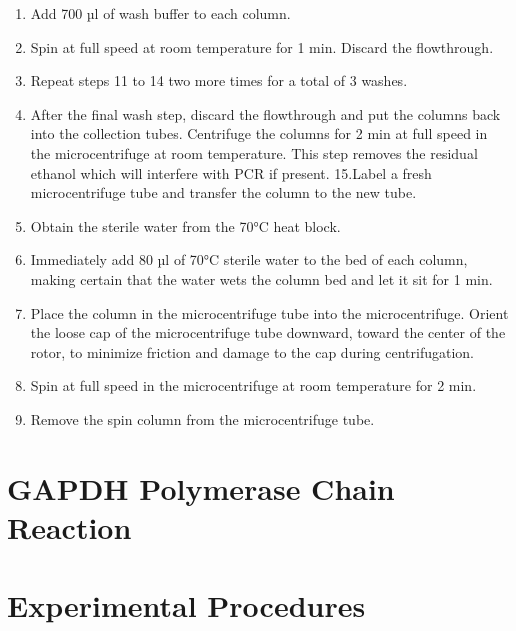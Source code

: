 \documentclass[]{book}
\providecommand{\tightlist}{%
  \setlength{\itemsep}{0pt}\setlength{\parskip}{0pt}}
\theoremstyle{definition}
\theoremstyle{definition}
\theoremstyle{definition}
\theoremstyle{remark}
\begin{document}
\begin{enumerate}
\def\labelenumi{\arabic{enumi}.}
\setcounter{enumi}{12}
\tightlist
\item
  Add 700 µl of wash buffer to each column.
\item
  Spin at full speed at room temperature for 1 min. Discard the
  flowthrough.
\item
  Repeat steps 11 to 14 two more times for a total of 3 washes.
\item
  After the final wash step, discard the flowthrough and put the columns
  back into the collection tubes. Centrifuge the columns for 2 min at
  full speed in the microcentrifuge at room temperature. This step
  removes the residual ethanol which will interfere with PCR if present.
  15.Label a fresh microcentrifuge tube and transfer the column to the
  new tube.
\item
  Obtain the sterile water from the 70°C heat block.
\item
  Immediately add 80 µl of 70°C sterile water to the bed of each column,
  making certain that the water wets the column bed and let it sit for 1
  min.
\item
  Place the column in the microcentrifuge tube into the microcentrifuge.
  Orient the loose cap of the microcentrifuge tube downward, toward the
  center of the rotor, to minimize friction and damage to the cap during
  centrifugation.
\item
  Spin at full speed in the microcentrifuge at room temperature for 2
  min.
\item
  Remove the spin column from the microcentrifuge tube.
\end{enumerate}

\section{GAPDH Polymerase Chain
Reaction}\label{gapdh-polymerase-chain-reaction}

\section{Experimental Procedures}\label{experimental-procedures-8}
\end{document}
